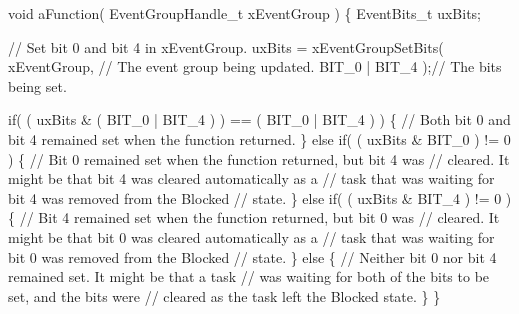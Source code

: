 \begin{DoxyPre}  void aFunction( EventGroupHandle\_t xEventGroup )
  \{
  EventBits\_t uxBits;\end{DoxyPre}



\begin{DoxyPre}    // Set bit 0 and bit 4 in xEventGroup.
    uxBits = xEventGroupSetBits(
                        xEventGroup,    // The event group being updated.
                        BIT\_0 | BIT\_4 );// The bits being set.\end{DoxyPre}



\begin{DoxyPre}    if( ( uxBits \& ( BIT\_0 | BIT\_4 ) ) == ( BIT\_0 | BIT\_4 ) )
    \{
        // Both bit 0 and bit 4 remained set when the function returned.
    \}
    else if( ( uxBits \& BIT\_0 ) != 0 )
    \{
        // Bit 0 remained set when the function returned, but bit 4 was
        // cleared.  It might be that bit 4 was cleared automatically as a
        // task that was waiting for bit 4 was removed from the Blocked
        // state.
    \}
    else if( ( uxBits \& BIT\_4 ) != 0 )
    \{
        // Bit 4 remained set when the function returned, but bit 0 was
        // cleared.  It might be that bit 0 was cleared automatically as a
        // task that was waiting for bit 0 was removed from the Blocked
        // state.
    \}
    else
    \{
        // Neither bit 0 nor bit 4 remained set.  It might be that a task
        // was waiting for both of the bits to be set, and the bits were
        // cleared as the task left the Blocked state.
    \}
  \}
  \end{DoxyPre}
 